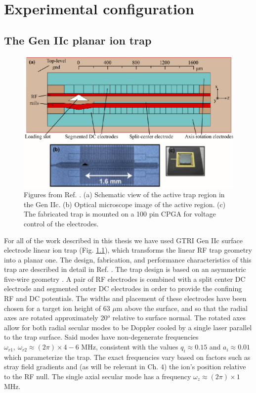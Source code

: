 \chapter{Experimental configuration}



\section{The Gen IIc planar ion trap}
 
\begin{figure}[t]
    \begin{center}
        \includegraphics{figures/3/Fig_genIItrapR}
        \caption{\label{fig:genIItrap} Figures from Ref. \cite{IonTrap}. (a) Schematic view of the active trap region in the Gen IIc. (b) Optical microscope image of the active region. (c) The fabricated trap is mounted on a 100 pin CPGA for voltage control of the electrodes.   }
    \end{center}
\end{figure}

For all of the work described in this thesis we have used GTRI Gen IIc surface electrode linear ion trap (Fig. \ref{fig:genIItrap}), which transforms the linear RF trap geometry into a planar one. The design, fabrication, and performance characteristics of this trap are described in detail in Ref. \cite{IonTrap}.  The trap design is based on an asymmetric five-wire geometry \cite{FiveWire}. A pair of RF electrodes is combined with a split center DC electrode and segmented outer DC electrodes in order to provide the confining RF and DC potentials. The widths and placement of these electrodes have been chosen for a target ion height of 63 $\mu$m above the surface, and so that the radial axes are rotated approximately 20$^o$ relative to surface normal. The rotated axes allow for both radial secular modes to be Doppler cooled by a single laser parallel to the trap surface. Said modes have non-degenerate frequencies $\omega_{r1}, \ \omega_{r2} \approx (2 \pi) \times 4-6$ MHz, consistent with the values $q_i \approx 0.15$ and $a_i \approx 0.01$ which parameterize the trap. The exact frequencies vary based on factors such as stray field gradients and (as will be relevant in Ch. 4) the ion's position relative to the RF null. The single axial secular mode has a frequency $\omega_{z} \approx (2 \pi) \times 1$ MHz.

